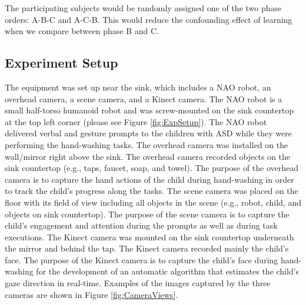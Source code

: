 The participating subjects would be randomly assigned one of the two phase orders: A-B-C and A-C-B.  This would reduce the confounding effect of learning when we compare between phase B and C.

\subsection{Experiment Setup}
\label{Sec:ExpSetup}
The equipment was set up near the sink, which includes a NAO robot, an overhead camera, a scene camera, and a Kinect camera. The NAO robot is a small half-torso humanoid robot and was screw-mounted on the sink countertop at the top left corner (please see Figure \ref{fig:ExpSetup}). The NAO robot delivered verbal and gesture prompts to the children with ASD while they were performing the hand-washing tasks.  The overhead camera was installed on the wall/mirror right above the sink. The overhead camera recorded objects on the sink countertop (e.g., taps, faucet, soap, and towel). The purpose of the overhead camera is to capture the hand actions of the child during hand-washing in order to track the child’s progress along the tasks. The scene camera was placed on the floor with its field of view including all objects in the scene (e.g., robot, child, and objects on sink countertop). The purpose of the scene camera is to capture the child’s engagement and attention during the prompts as well as during task executions. The Kinect camera was mounted on the sink countertop underneath the mirror and behind the tap. The Kinect camera recorded mainly the child’s face. The purpose of the Kinect camera is to capture the child’s face during hand-washing for the development of an automatic algorithm that estimates the child’s gaze direction in real-time. Examples of the images captured by the three cameras are shown in Figure \ref{fig:CameraViews}.
